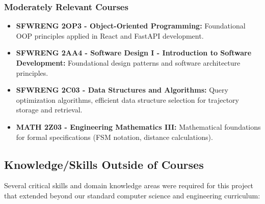 \documentclass{article}
\begin{document}
\subsubsection*{Moderately Relevant Courses}

\begin{itemize}
    \item \textbf{SFWRENG 2OP3 - Object-Oriented Programming:} Foundational OOP principles applied in React and FastAPI development.
    
    \item \textbf{SFWRENG 2AA4 - Software Design I - Introduction to Software Development:} Foundational design patterns and software architecture principles.
    
    \item \textbf{SFWRENG 2C03 - Data Structures and Algorithms:} Query optimization algorithms, efficient data structure selection for trajectory storage and retrieval.
    
    \item \textbf{MATH 2Z03 - Engineering Mathematics III:} Mathematical foundations for formal specifications (FSM notation, distance calculations).
\end{itemize}

\subsection{Knowledge/Skills Outside of Courses}

\par{Several critical skills and domain knowledge areas were required for this project that extended beyond our standard computer science and engineering curriculum:}
\end{document}
